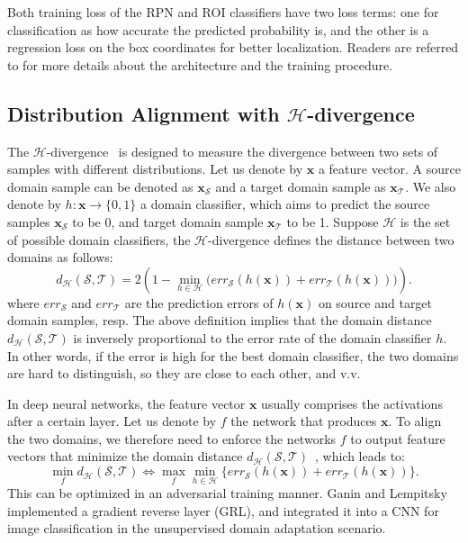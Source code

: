 \documentclass[10pt,twocolumn,letterpaper]{article}
\def\cH{\mathcal{H}}
\def\cS{\mathcal{S}}
\def\cT{\mathcal{T}}
\def\x{\mathbf{x}}
\begin{document}
Both training loss of the RPN and ROI classifiers have two loss terms: one for classification as how accurate the predicted probability is, and the other is a regression loss on the box coordinates for better localization. Readers are referred to \cite{zhang2016Faster} for more details about the architecture and the training procedure.

\subsection{Distribution Alignment with $\cH$-divergence}
\label{sec:h_divergence}
The $\cH$-divergence~\cite{ben2010theory} is designed to measure the divergence between two sets of samples with different distributions. Let us denote by $\x$ a feature vector. A source domain sample can be denoted as $\x_{\cS}$ and a target domain sample as $\x_{\cT}$. We also denote by $h:\x\rightarrow\{0, 1\}$ a domain classifier, which aims to predict the source samples $\x_{\cS}$ to be $0$, and target domain sample $\x_{\cT}$ to be 1. Suppose $\cH$ is the set of possible domain classifiers, the $\cH$-divergence defines the distance between two domains as follows:
\begin{equation}
d_{\cH}(\cS, \cT) = 2 \left(1 - \min_{h\in \cH}\Big(err_{\cS}(h(\x)) + err_{\cT}(h(\x))\Big)\right). \nonumber
\end{equation}
where $err_{\cS}$ and $err_{\cT}$ are the prediction errors of $h(\x)$ on source and target domain samples, resp. The above definition implies that the domain distance $d_{\cH}(\cS, \cT)$ is inversely proportional to the error rate of the domain classifier $h$. In other words, if the error is high for the best domain classifier, the two domains are hard to distinguish, so they are close to each other, and v.v. 

In deep neural networks, the feature vector $\x$ usually comprises the activations after a certain layer. Let us denote by $f$ the network that produces $\x$. To align the two domains, we therefore need to enforce the networks $f$ to output feature vectors that minimize the domain distance $d_{\cH}(\cS, \cT)$~\cite{ganin2015unsupervised}, which leads to:
\begin{equation}
\min_{f}d_{\cH}(\cS, \cT) \Leftrightarrow \max_{f}\min_{h\in \cH}\{err_{\cS}(h(\x)) + err_{\cT}(h(\x))\}. \nonumber
\end{equation}
This can be optimized in an adversarial training manner. Ganin and Lempitsky~\cite{ganin2015unsupervised} implemented a gradient reverse layer (GRL), and integrated it into a CNN for image classification in the unsupervised domain adaptation scenario. 
\end{document}
